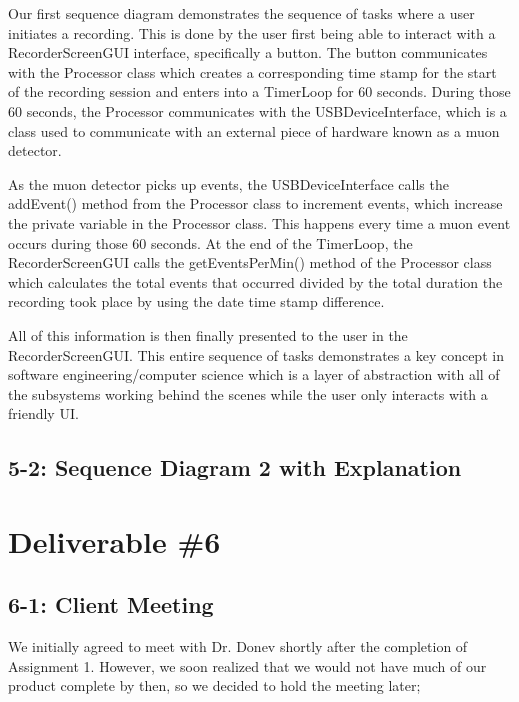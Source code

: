 \documentclass[11pt,a4paper]{article}
\begin{document}
Our first sequence diagram demonstrates the sequence of tasks where a user initiates a recording. This is done by the user first being able to interact with a RecorderScreenGUI interface, specifically a button. The button communicates with the Processor class which creates a corresponding time stamp for the start of the recording session and enters into a TimerLoop for 60 seconds. During those 60 seconds, the Processor communicates with the USBDeviceInterface, which is a class used to communicate with an external piece of hardware known as a muon detector. 

As the muon detector picks up events, the USBDeviceInterface calls the addEvent() method from the Processor class to increment events, which increase the private variable in the Processor class. This happens every time a muon event occurs during those 60 seconds. At the end of the TimerLoop, the RecorderScreenGUI calls the getEventsPerMin() method of the Processor class which calculates the total events that occurred divided by the total duration the recording took place by using the date time stamp difference. 

All of this information is then finally presented to the user in the RecorderScreenGUI. This entire sequence of tasks demonstrates a key concept in software engineering/computer science which is a layer of abstraction with all of the subsystems working behind the scenes while the user only interacts with a friendly UI. 

\newpage
\subsection*{5-2: Sequence Diagram 2 with Explanation}

\newpage

\section*{Deliverable \#6}

\subsection*{6-1: Client Meeting}

We initially agreed to meet with Dr. Donev shortly after the completion of Assignment 1. However, we soon realized that we would not have much of our product complete by then, so we decided to hold the meeting later;
\end{document}

